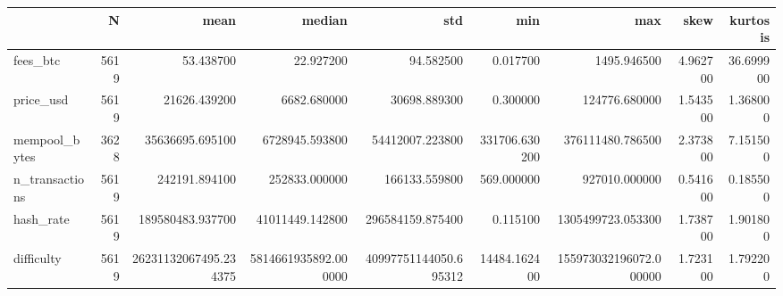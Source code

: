 \begin{tabular}{lrrrrrrrr}
\toprule
 & N & mean & median & std & min & max & skew & kurtosis \\
\midrule
fees_btc & 5619 & 53.438700 & 22.927200 & 94.582500 & 0.017700 & 1495.946500 & 4.962700 & 36.699900 \\
price_usd & 5619 & 21626.439200 & 6682.680000 & 30698.889300 & 0.300000 & 124776.680000 & 1.543500 & 1.368000 \\
mempool_bytes & 3628 & 35636695.695100 & 6728945.593800 & 54412007.223800 & 331706.630200 & 376111480.786500 & 2.373800 & 7.151500 \\
n_transactions & 5619 & 242191.894100 & 252833.000000 & 166133.559800 & 569.000000 & 927010.000000 & 0.541600 & 0.185500 \\
hash_rate & 5619 & 189580483.937700 & 41011449.142800 & 296584159.875400 & 0.115100 & 1305499723.053300 & 1.738700 & 1.901800 \\
difficulty & 5619 & 26231132067495.234375 & 5814661935892.000000 & 40997751144050.695312 & 14484.162400 & 155973032196072.000000 & 1.723100 & 1.792200 \\
\bottomrule
\end{tabular}
